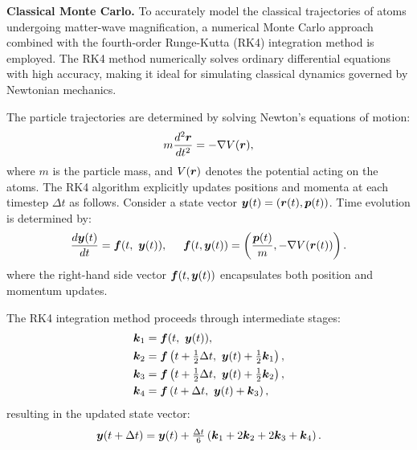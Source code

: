 


\textbf{Classical Monte Carlo.} To accurately model the classical trajectories of atoms undergoing matter-wave magnification, a numerical Monte Carlo approach combined with the fourth-order Runge-Kutta (RK4) integration method is employed. The RK4 method numerically solves ordinary differential equations with high accuracy, making it ideal for simulating classical dynamics governed by Newtonian mechanics.



The particle trajectories are determined by solving Newton's equations of motion:
\begin{equation}
m \frac{d^2 \boldsymbol{r}}{dt^2} = -\nabla V(\boldsymbol{r}),
\end{equation}
where $m$ is the particle mass, and $V(\boldsymbol{r})$ denotes the potential acting on the atoms. 
The RK4 algorithm explicitly updates positions and momenta at each timestep $\Delta t$ as follows. Consider a state vector $\boldsymbol{y}(t) = (\boldsymbol{r}(t), \boldsymbol{p}(t))$. Time evolution is determined by:
\begin{equation*}
\frac{d \boldsymbol{y}(t)}{dt} = \boldsymbol{f}(t,\ \boldsymbol{y}(t)),
\hspace{5 mm} 
\boldsymbol{f}(t, \boldsymbol{y}(t)) = \left(\frac{\boldsymbol{p}(t)}{m}, -\nabla V(\boldsymbol{r}(t))\right).
\end{equation*}
where the right-hand side vector $\boldsymbol{f}(t, \boldsymbol{y}(t))$ encapsulates both position and momentum updates. 

The RK4 integration method proceeds through intermediate stages:
\begin{align*}
\boldsymbol{k}_1 &= \boldsymbol{f}(t,\ \boldsymbol{y}(t)), \\
\boldsymbol{k}_2 &= \boldsymbol{f}\left(t + \tfrac{1}{2}\Delta t,\ \boldsymbol{y}(t) + \tfrac{1}{2}\boldsymbol{k}_1\right), \\
\boldsymbol{k}_3 &= \boldsymbol{f}\left(t + \tfrac{1}{2}\Delta t,\ \boldsymbol{y}(t) + \tfrac{1}{2}\boldsymbol{k}_2\right), \\
\boldsymbol{k}_4 &= \boldsymbol{f}\left(t + \Delta t,\ \boldsymbol{y}(t) + \boldsymbol{k}_3\right),
\end{align*}
resulting in the updated state vector:
\begin{equation*}
\boldsymbol{y}(t + \Delta t) = \boldsymbol{y}(t) + \tfrac{\Delta t}{6}\left(\boldsymbol{k}_1 + 2\boldsymbol{k}_2 + 2\boldsymbol{k}_3 + \boldsymbol{k}_4\right).
\end{equation*}

